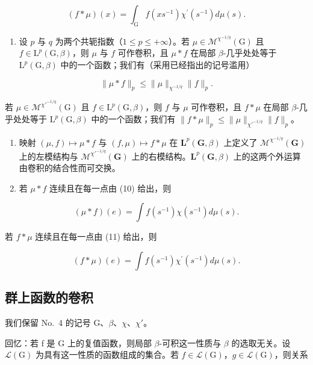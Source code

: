 \[
(f * \mu) (x) = \int_ {\mathrm{G}} f (x s ^ {- 1}) \chi^ {\prime} (s ^ {- 1}) d \mu (s).\tag{11}
\]

\begin{enumerate}
\def\labelenumi{\arabic{enumi})}
\setcounter{enumi}{1}
\tightlist
\item
  设 \(p\) 与 \(q\) 为两个共轭指数（\(1 \leqslant p \leqslant +\infty\)）。若 \(\mu \in \mathcal{M}^{\chi^{-1/q}}(\mathrm{G})\) 且 \(f \in \mathrm{L}^p(\mathrm{G},\beta)\)，则 \(\mu\) 与 \(f\) 可作卷积，且 \(\mu * f\) 在局部 \(\beta\)-几乎处处等于 \(\mathrm{L}^p(\mathrm{G},\beta)\) 中的一个函数；我们有（采用已经指出的记号滥用）
\end{enumerate}

\[
\| \mu * f \| _ {p} \leqslant \| \mu \| _ {\chi^ {- 1 / q}} \| f \| _ {p}.
\]

若 \(\mu \in \mathcal{M}^{\chi'^{-1/q}}(\mathrm{G})\) 且 \(f \in \mathrm{L}^p(\mathrm{G},\beta)\)，则 \(f\) 与 \(\mu\) 可作卷积，且 \(f * \mu\) 在局部 \(\beta\)-几乎处处等于 \(\mathrm{L}^p(\mathrm{G},\beta)\) 中的一个函数；我们有 \(\| f * \mu \|_p \leqslant \| \mu \|_{\chi'^{-1/q}} \| f \|_p\)。

\begin{enumerate}
\def\labelenumi{\arabic{enumi})}
\setcounter{enumi}{2}
\item
  映射 \((\mu, f) \mapsto \mu * f\) 与 \((f, \mu) \mapsto f * \mu\) 在 \(\mathbf{L}^p(\mathbf{G}, \beta)\) 上定义了 \(\mathcal{M}^{\chi^{-1/q}}(\mathbf{G})\) 上的左模结构与 \(\mathcal{M}^{\chi'^{-1/q}}(\mathbf{G})\) 上的右模结构。\(\mathbf{L}^p(\mathbf{G}, \beta)\) 上的这两个外运算由卷积的结合性而可交换。
\item
  若 \(\mu * f\) 连续且在每一点由 (10) 给出，则
\end{enumerate}

\[
(\mu * f) (e) = \int f (s ^ {- 1}) \chi (s ^ {- 1}) d \mu (s).\tag{12}
\]

若 \(f * \mu\) 连续且在每一点由 (11) 给出，则

\[
(f * \mu) (e) = \int f (s ^ {- 1}) \chi^ {\prime} (s ^ {- 1}) d \mu (s).\tag{13}
\]

\subsection{群上函数的卷积}

我们保留 No.~4 的记号 G、\(\beta\)、\(\chi\)、\(\chi'\)。

回忆：若 f 是 G 上的复值函数，则局部 \(\beta\)-可积这一性质与 \(\beta\) 的选取无关。设 \(\mathcal{L}(\mathrm{G})\) 为具有这一性质的函数组成的集合。若 \(f \in \mathcal{L}(\mathrm{G})\)，\(g \in \mathcal{L}(\mathrm{G})\)，则关系

